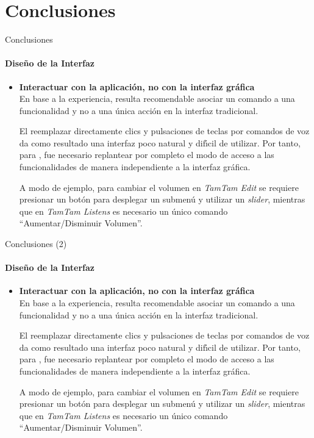 \section{Conclusiones}

\begin{frame}{Conclusiones}
\framesubtitle{Dise\~no de la Interfaz}
\begin{itemize}
\item{\textbf{Interactuar con la aplicaci\'on, no con la interfaz gr\'afica\\}}
En base a la experiencia, resulta recomendable asociar un comando a una funcionalidad
y no a una \'unica acci\'on en la interfaz tradicional.

El reemplazar directamente clics y pulsaciones de teclas por comandos de voz da
como resultado una interfaz poco natural y dif{\'\i}cil de utilizar. Por tanto, para
, fue necesario replantear por completo el modo de acceso a las 
funcionalidades de manera independiente a la interfaz gr\'afica.

A modo de ejemplo, para cambiar el volumen en \emph{TamTam Edit} se requiere presionar un 
bot\'on para desplegar un submen\'u y utilizar un \emph{slider}, mientras que en \emph{TamTam Listens}
es necesario un \'unico comando ``Aumentar/Disminuir Volumen''.

\end{itemize}
\end{frame}

\begin{frame}{Conclusiones (2)}
\framesubtitle{Dise\~no de la Interfaz}
\begin{itemize}

\item{\textbf{Interactuar con la aplicaci\'on, no con la interfaz gr\'afica\\}}
En base a la experiencia, resulta recomendable asociar un comando a una funcionalidad
y no a una \'unica acci\'on en la interfaz tradicional.

El reemplazar directamente clics y pulsaciones de teclas por comandos de voz da
como resultado una interfaz poco natural y dif{\'\i}cil de utilizar. Por tanto, para
, fue necesario replantear por completo el modo de acceso a las 
funcionalidades de manera independiente a la interfaz gr\'afica.

A modo de ejemplo, para cambiar el volumen en \emph{TamTam Edit} se requiere presionar un 
bot\'on para desplegar un submen\'u y utilizar un \emph{slider}, mientras que en \emph{TamTam Listens}
es necesario un \'unico comando ``Aumentar/Disminuir Volumen''.
\end{itemize}
\end{frame}

